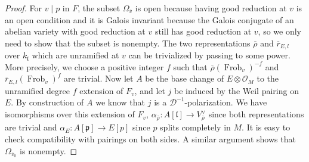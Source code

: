 \documentclass[10pt]{article}
\theoremstyle{definition}
\numberwithin{equation}{theorem}
\newcommand{\calD}{\mathcal{D}}
\newcommand{\calO}{\mathcal{O}}
\newcommand{\gothl}{\mathfrak{l}}
\newcommand{\gothp}{\mathfrak{p}}
\DeclareMathOperator{\Frob}{Frob}
\begin{document}
\begin{proof}
For $v\mid p$ in $F$, the subset $\Omega_{\overline{v}}$ is open because having good reduction at $v$ is an open condition and it is Galois invariant because the Galois conjugate of an abelian variety with good reduction at $v$ still has good reduction at $v$, so we only need to show that the subset is nonempty. The two representations $\overline{\rho}$ and $\overline{r}_{E,l}$ over $k_\gothl$ which are unramified at $v$ can be trivialized by passing to some power. More precisely, we choose a positive integer $f$ such that $\overline{\rho}(\Frob_v)^{-f}$ and $\overline{r}_{E,l}(\Frob_v)^f$ are trivial. Now let $A$ be the base change of $E\otimes\calO_M$ to the unramified degree $f$ extension of $F_v$, and let $j$ be induced by the Weil pairing on $E$. By construction of $A$ we know that $j$ is a $\calD^{-1}$-polarization. We have isomorphisms over this extension of $F_v$, $\alpha_{\overline{\rho}}:A[\gothl]\to V_{\overline{\rho}}^\vee$ since both representations are trivial and $\alpha_E:A[\gothp]\to E[p]$ since $p$ splits completely in $M$. It is easy to check compatibility with pairings on both sides. A similar argument shows that $\Omega_{\overline{v}_0}$ is nonempty.


\end{proof}
\end{document}
